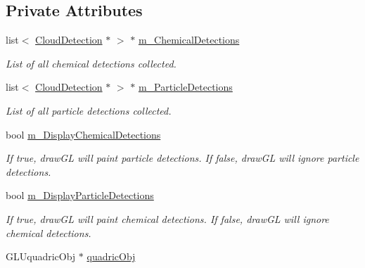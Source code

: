 \subsection*{Private Attributes}
\begin{DoxyCompactItemize}
\item 
\hypertarget{class_cloud_detection_belief_a5d7392e247387220a3542a0cfa8f817a}{
list$<$ \hyperlink{class_cloud_detection}{CloudDetection} $\ast$ $>$ $\ast$ \hyperlink{class_cloud_detection_belief_a5d7392e247387220a3542a0cfa8f817a}{m\_\-ChemicalDetections}}
\label{class_cloud_detection_belief_a5d7392e247387220a3542a0cfa8f817a}

\begin{DoxyCompactList}\small\item\em List of all chemical detections collected. \end{DoxyCompactList}\item 
\hypertarget{class_cloud_detection_belief_ae3d512a58c50aa9f1fef915732e318fa}{
list$<$ \hyperlink{class_cloud_detection}{CloudDetection} $\ast$ $>$ $\ast$ \hyperlink{class_cloud_detection_belief_ae3d512a58c50aa9f1fef915732e318fa}{m\_\-ParticleDetections}}
\label{class_cloud_detection_belief_ae3d512a58c50aa9f1fef915732e318fa}

\begin{DoxyCompactList}\small\item\em List of all particle detections collected. \end{DoxyCompactList}\item 
\hypertarget{class_cloud_detection_belief_ab0105044a74037c3a153daee908282c6}{
bool \hyperlink{class_cloud_detection_belief_ab0105044a74037c3a153daee908282c6}{m\_\-DisplayChemicalDetections}}
\label{class_cloud_detection_belief_ab0105044a74037c3a153daee908282c6}

\begin{DoxyCompactList}\small\item\em If true, drawGL will paint particle detections. If false, drawGL will ignore particle detections. \end{DoxyCompactList}\item 
\hypertarget{class_cloud_detection_belief_a6540cd54ef473e72cbba7b49f8e4f536}{
bool \hyperlink{class_cloud_detection_belief_a6540cd54ef473e72cbba7b49f8e4f536}{m\_\-DisplayParticleDetections}}
\label{class_cloud_detection_belief_a6540cd54ef473e72cbba7b49f8e4f536}

\begin{DoxyCompactList}\small\item\em If true, drawGL will paint chemical detections. If false, drawGL will ignore chemical detections. \end{DoxyCompactList}\item 
\hypertarget{class_cloud_detection_belief_ab0da10f697659f9f0204c0da99e7a38a}{
GLUquadricObj $\ast$ \hyperlink{class_cloud_detection_belief_ab0da10f697659f9f0204c0da99e7a38a}{quadricObj}}
\label{class_cloud_detection_belief_ab0da10f697659f9f0204c0da99e7a38a}


\end{DoxyCompactItemize}
